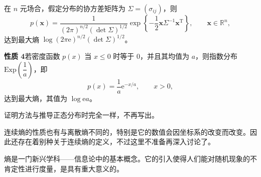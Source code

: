 \documentclass[../../main.tex]{subfiles}
\begin{document}
在 $n$ 元场合，假定分布的协方差矩阵为 $\Sigma=(\sigma_{ij})$，则
\[
p(\boldsymbol{x})=\frac{1}{(2\pi)^{n/2}(\det\Sigma)^{1/2}}\exp\left\{-\frac12\boldsymbol{x}\Sigma^{-1}\boldsymbol{x}^{\mathrm{T}}\right\},\qquad \boldsymbol{x}\in\mathbb{R}^n,
\]
达到最大熵 $\log(2\pi\mathrm{e})^{n/2}(\det\Sigma)^{1/2}$。

\noindent\textbf{性质 4}\quad 若密度函数 $p(x)$ 当 $x\leqslant 0$ 时等于 $0$，并且其均值为 $a$，则指数分布 $\mathrm{Exp}\left(\dfrac{1}{a}\right)$，即
\[
p(x)=\frac1a\mathrm{e}^{-x/a},\qquad x>0,
\]
达到最大熵，其值为 $\log\mathrm{e}a$。

证明方法与推导正态分布时完全一样，不再写出。

连续熵的性质也有与离散熵不同的，特别是它的数值会因坐标系的改变而改变。因此还存在着别种关于连续熵的定义，不过这里不准备再深入讨论了。

熵是一门新兴学科——信息论中的基本概念。它的引入使得人们能对随机现象的不肯定性进行度量，是具有重大意义的。
\end{document}
